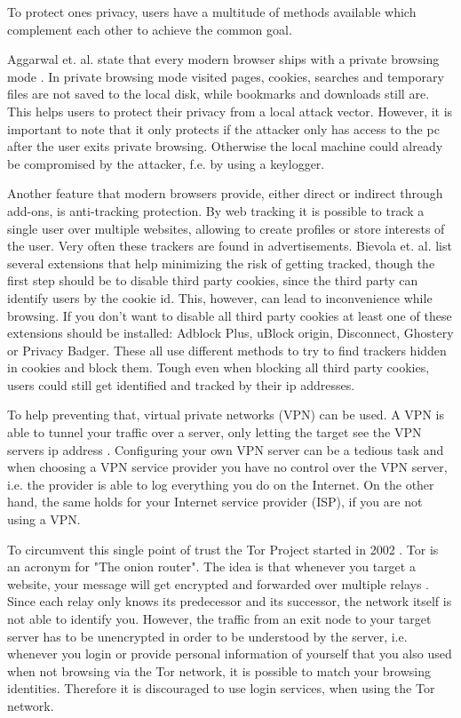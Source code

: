 \documentclass[a4paper]{llncs}
\begin{document}

To protect ones privacy, users have a multitude of methods available which complement each other to achieve the common goal.

Aggarwal et. al. state that every modern browser ships with a private browsing mode \cite{Aggarwal:2010:APB:1929820.1929828}. In private browsing mode visited pages, cookies, searches and temporary files are not saved to the local disk, while bookmarks and downloads still are. This helps users to protect their privacy from a local attack vector. However, it is important to note that it only protects if the attacker only has access to the pc after the user exits private browsing. Otherwise the local machine could already be compromised by the attacker, f.e. by using a keylogger.

Another feature that modern browsers provide, either direct or indirect through add-ons, is anti-tracking protection. By web tracking it is possible to track a single user over multiple websites, allowing to create profiles or store interests of the user. Very often these trackers are found in advertisements. Bievola et. al. \cite{Bielova:2017:WTT:3133956.3136067} list several extensions that help minimizing the risk of getting tracked, though the first step should be to disable third party cookies, since the third party can identify users by the cookie id. This, however, can lead to inconvenience while browsing. If you don't want to disable all third party cookies at least one of these extensions should be installed: Adblock Plus, uBlock origin, Disconnect, Ghostery or Privacy Badger. These all use different methods to try to find trackers hidden in cookies and block them. Tough even when blocking all third party cookies, users could still get identified and tracked by their ip addresses.

To help preventing that, virtual private networks (VPN) can be used. A VPN 
is able to tunnel your traffic over a server, only letting the target see the VPN servers ip address \cite{Feilner:2006:OBI:1202604}. Configuring your own VPN server can be a tedious task and when choosing a VPN service provider you have no control over the VPN server, i.e. the provider is able to log everything you do on the Internet. On the other hand, the same holds for your Internet service provider (ISP), if you are not using a VPN.

To circumvent this single point of trust the Tor Project started in 2002 \cite{torproject}. Tor is an acronym for "The onion router". The idea is that whenever you target a website, your message will get encrypted and forwarded over multiple relays \cite{Dingledine:2004:TSO:1251375.1251396}. Since each relay only knows its predecessor and its successor, the network itself is not able to identify you. However, the traffic from an exit node to your target server has to be unencrypted in order to be understood by the server, i.e. whenever you login or provide personal information of yourself that you also used when not browsing via the Tor network, it is possible to match your browsing identities. Therefore it is discouraged to use login services, when using the Tor network.
\end{document}

